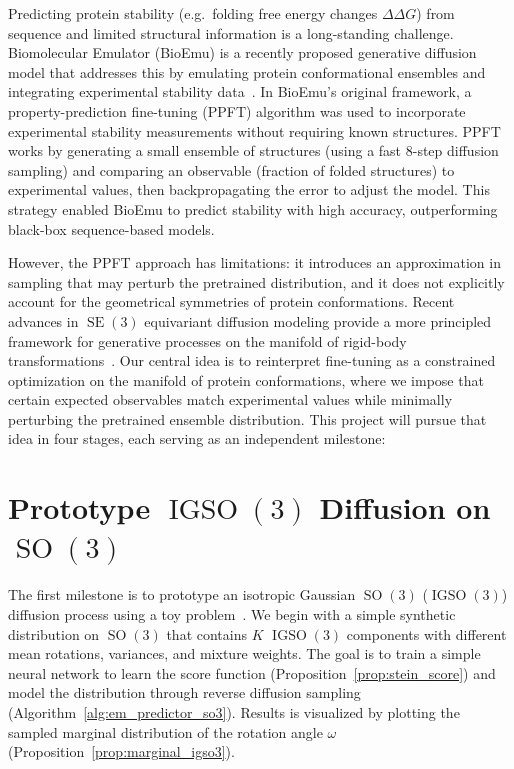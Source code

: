 \documentclass{article}
\theoremstyle{plain}
\theoremstyle{definition}
\theoremstyle{remark}
\DeclareMathOperator{\SE}{SE}
\DeclareMathOperator{\SO}{SO}
\DeclareMathOperator{\IGSO}{IGSO}
\begin{document}
Predicting protein stability (e.g.\ folding free energy changes $\Delta\Delta G$) from sequence and limited structural information is a long-standing challenge. Biomolecular Emulator (BioEmu) is a recently proposed generative diffusion model that addresses this by emulating protein conformational ensembles and integrating experimental stability data~\cite{bioemu}. In BioEmu's original framework, a property-prediction fine-tuning (PPFT) algorithm was used to incorporate experimental stability measurements without requiring known structures. PPFT works by generating a small ensemble of structures (using a fast $8$-step diffusion sampling) and comparing an observable (fraction of folded structures) to experimental values, then backpropagating the error to adjust the model. This strategy enabled BioEmu to predict stability with high accuracy, outperforming black-box sequence-based models.

However, the PPFT approach has limitations: it introduces an approximation in sampling that may perturb the pretrained distribution, and it does not explicitly account for the geometrical symmetries of protein conformations. Recent advances in $\SE(3)$ equivariant diffusion modeling provide a more principled framework for generative processes on the manifold of rigid-body transformations~\cite{se3_diffusion}. Our central idea is to reinterpret fine-tuning as a constrained optimization on the manifold of protein conformations, where we impose that certain expected observables match experimental values while minimally perturbing the pretrained ensemble distribution. This project will pursue that idea in four stages, each serving as an independent milestone:

\section{Prototype $\IGSO(3)$ Diffusion on $\SO(3)$}

The first milestone is to prototype an isotropic Gaussian $\SO(3)$ ($\IGSO(3)$) diffusion process using a toy problem~\cite{so3_diffusion}. We begin with a simple synthetic distribution on $\SO(3)$ that contains $K$ $\IGSO(3)$ components with different mean rotations, variances, and mixture weights. The goal is to train a simple neural network to learn the score function (Proposition~\ref{prop:stein_score}) and model the distribution through reverse diffusion sampling (Algorithm~\ref{alg:em_predictor_so3}). Results is visualized by plotting the sampled marginal distribution of the rotation angle $\omega$ (Proposition~\ref{prop:marginal_igso3}).
\end{document}
